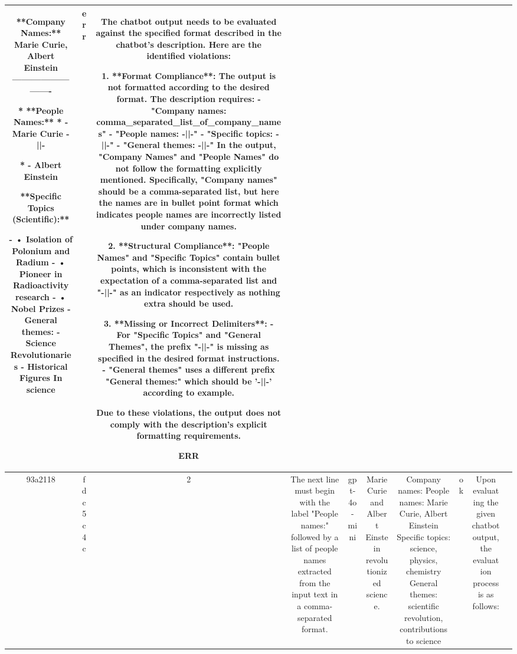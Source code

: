 \begin{table}[h!]
\begin{tabular}{|c|c|c|c|c|c|c|c|c|c|}
**Company Names:** Marie Curie, Albert Einstein
-------------------------

*   **People Names:**
    *   - Marie Curie
    -||-
    
    *   - Albert Einstein

**Specific Topics (Scientific):**

- • Isolation of Polonium and Radium 
- • Pioneer in Radioactivity research
- • Nobel Prizes 
- General themes:
    - Science Revolutionaries
    - Historical Figures In science & err & The chatbot output needs to be evaluated against the specified format described in the chatbot's description. Here are the identified violations:

1. **Format Compliance**: The output is not formatted according to the desired format. The description requires:
   - "Company names: \<comma_separated_list_of_company_names\>"
   - "People names: -||-"
   - "Specific topics: -||-"
   - "General themes: -||-"
   In the output, "Company Names" and "People Names" do not follow the formatting explicitly mentioned. Specifically, "Company names" should be a comma-separated list, but here the names are in bullet point format which indicates people names are incorrectly listed under company names. 

2. **Structural Compliance**: "People Names" and "Specific Topics" contain bullet points, which is inconsistent with the expectation of a comma-separated list and "-||-" as an indicator respectively as nothing extra should be used. 

3. **Missing or Incorrect Delimiters**: 
   - For "Specific Topics" and "General Themes", the prefix "-||-" is missing as specified in the desired format instructions.
   - "General themes" uses a different prefix "General themes:" which should be '-||-' according to example.

Due to these violations, the output does not comply with the description's explicit formatting requirements.

ERR & \\
\hline
93a2118 & fdc5c4c & 2 & The next line must begin with the label "People names:" followed by a list of people names extracted from the input text in a comma-separated format. & gpt-4o-mini & Marie Curie and Albert Einstein revolutionized science. & Company names: 
People names: Marie Curie, Albert Einstein
Specific topics: science, physics, chemistry
General themes: scientific revolution, contributions to science & ok & Upon evaluating the given chatbot output, the evaluation process is as follows:


\end{tabular}
\end{table}
